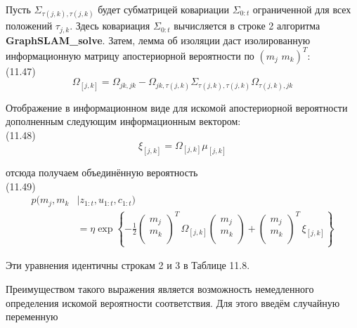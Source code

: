 \documentclass[10pt,a4paper]{article}
\begin{document}
Пусть $\varSigma_{\tau(j,k),\tau(j,k)}$ будет субматрицей ковариации $\varSigma_{0:t}$ ограниченной для всех положений $\tau_{j,k}$. Здесь ковариация $\varSigma_{0:t}$ вычисляется в строке 2 алгоритма \textbf{GraphSLAM\_solve}. Затем, лемма об изоляции даст изолированную информационную матрицу апостериорной вероятности по $(m_j\,\,m_k)^T$:\\

(11.47)
$$\varOmega_{[j,k]}=\varOmega_{jk,jk}-\varOmega_{jk,\tau(j,k)}\varSigma_{\tau(j,k),\tau(j,k)}\varOmega_{\tau(j,k),jk}$$

Отображение в информационном виде для искомой апостериорной вероятности дополненным следующим информационным вектором:\\

(11.48)
$$\xi_{[j,k]}=\varOmega_{[j,k]}\mu_{[j,k]}$$

отсюда получаем объединённую вероятность\\

(11.49)
\begin{equation*}
\begin{split}
p(m_j,m_k&|z_{1:t},u_{1:t},c_{1:t})\\
&=\eta\exp\left\lbrace -\frac{1}{2}\left(\begin{array}{c}m_j\\
m_k\\
\end{array} \right)^T\,\varOmega_{[j,k]}\left(\begin{array}{c}m_j\\
m_k\\
\end{array} \right)+\left(\begin{array}{c}m_j\\
m_k\\
\end{array} \right)^T\,\xi_{[j,k]}\right\rbrace 
\end{split}
\end{equation*}

Эти уравнения идентичны строкам 2 и 3 в Таблице 11.8.

Преимуществом такого выражения является возможность немедленного определения искомой вероятности соответствия. Для этого введём случайную переменную\\
\end{document}
